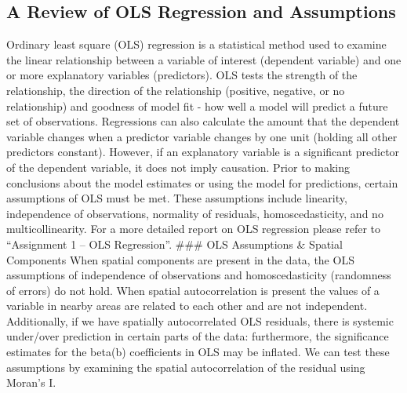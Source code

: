 \documentclass[
]{article}
\begin{document}
\hypertarget{a-review-of-ols-regression-and-assumptions}{%
\subsection{A Review of OLS Regression and
Assumptions}\label{a-review-of-ols-regression-and-assumptions}}

Ordinary least square (OLS) regression is a statistical method used to
examine the linear relationship between a variable of interest
(dependent variable) and one or more explanatory variables (predictors).
OLS tests the strength of the relationship, the direction of the
relationship (positive, negative, or no relationship) and goodness of
model fit - how well a model will predict a future set of observations.
Regressions can also calculate the amount that the dependent variable
changes when a predictor variable changes by one unit (holding all other
predictors constant). However, if an explanatory variable is a
significant predictor of the dependent variable, it does not imply
causation. Prior to making conclusions about the model estimates or
using the model for predictions, certain assumptions of OLS must be met.
These assumptions include linearity, independence of observations,
normality of residuals, homoscedasticity, and no multicollinearity. For
a more detailed report on OLS regression please refer to ``Assignment 1
-- OLS Regression''. \#\#\# OLS Assumptions \& Spatial Components When
spatial components are present in the data, the OLS assumptions of
independence of observations and homoscedasticity (randomness of errors)
do not hold. When spatial autocorrelation is present the values of a
variable in nearby areas are related to each other and are not
independent. Additionally, if we have spatially autocorrelated OLS
residuals, there is systemic under/over prediction in certain parts of
the data: furthermore, the significance estimates for the beta(b)
coefficients in OLS may be inflated. We can test these assumptions by
examining the spatial autocorrelation of the residual using Moran's I.
\end{document}
